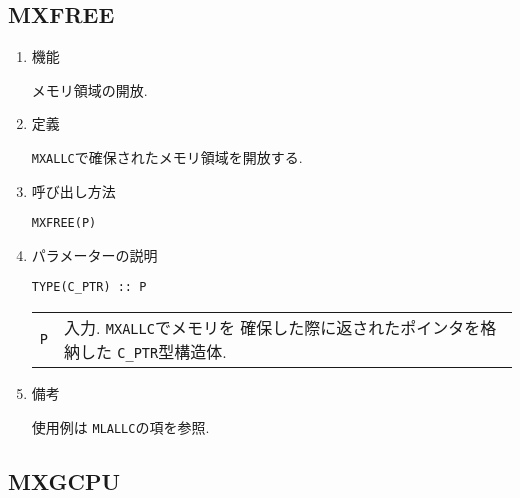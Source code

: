 \documentclass[a4j]{jsarticle}
\begin{document}
\subsection{MXFREE}

\begin{enumerate}

\item 機能 

メモリ領域の開放.

\item 定義

\texttt{MXALLC}で確保されたメモリ領域を開放する.

\item 呼び出し方法 
    
\texttt{MXFREE(P)}
  
\item パラメーターの説明

\begin{verbatim}
TYPE(C_PTR) :: P
\end{verbatim}
  
\begin{tabular}{ll}
\texttt{P} & 入力. \texttt{MXALLC}でメモリを
確保した際に返されたポインタを格納した \texttt{C\_PTR}型構造体.
\end{tabular}

\item 備考

使用例は \texttt{MLALLC}の項を参照.

\end{enumerate}


\subsection{MXGCPU}
\end{document}
